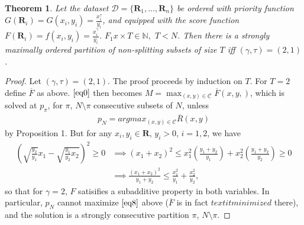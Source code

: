 \documentclass{article}
\newtheorem{thm}{Theorem}
\theoremstyle{case}
\begin{document}
\begin{thm} \label{thm1}
Let the dataset $\mathcal{D} = \{ \mathbf{R}_1, \ldots, \mathbf{R}_n \}$ be ordered with priority function $G(\mathbf{R}_i) = G(x_i,y_i) =  \frac{x_i^\tau}{y_i}$, and equipped with the score function $F(\mathbf{R}_i) = f(x_i,y_i) = \frac{x_i^\gamma}{y_i}$. $F_1x \times T \in \mathbb{N},$ $T < N$. Then there is a strongly maximally ordered partition of non-splitting subsets of size $T$ iff $(\gamma, \tau) = (2,1)$.
\end{thm}
\begin{proof}
Let $\left( \gamma, \tau\right) = \left( 2,1\right)$. The proof proceeds by induction on $T$. For $T=2$ define $\overline{F}$ as above. $\ref{eq0}$ then becomes $M = \max_{\left( x,y\right) \in \underline{\mathcal{C}}} \overline{F}\left( x,y,\right)$, which is solved at $p_{\pi}$, for $\pi$, $N\setminus \pi$ consecutive subsets of $N$, unless 
\begin{align} \label{eq8}
p_N = argmax_{\left( x,y\right) \in \mathcal{C}} \overline{R}\left( x,y\right)
\end{align} by Proposition 1. But for any $x_i, y_i \in \mathbf{R}$, $y_i > 0$, $i = 1,2$, we have
\begin{align*}
\left( \sqrt{\frac{y_2}{y_1}}x_1 - \sqrt{\frac{y_1}{y_2}x_2}\right)^2 \geq 0 &\implies \left( x_1+x_2\right)^2 \leq x_1^2\left( \frac{y_1+y_2}{y_1}\right) + x_2^2\left( \frac{y_1+y_2}{y_2}\right) \geq 0 \\
&\implies \frac{\left( x_1+x_2\right)^2}{y_1+y_2} \leq \frac{x_1^2}{y_1} + \frac{x_2^2}{y_2},
\end{align*}
so that for $\gamma = 2$, $F$ satisifies a subadditive property in both variables. In particular, $p_N$ cannot maximize $\ref{eq8}$ above ($\overline{F}$ is in fact $textit{minimized}$ there), and the solution is a strongly consecutive partition $\pi$, $N\setminus \pi$. 


\end{proof}
\end{document}
